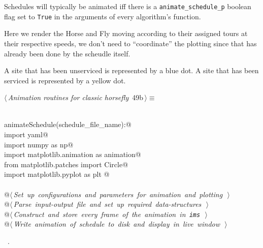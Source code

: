 \documentclass[11.5pt]{report}
\begin{document}
Schedules will typically be animated iff there is a \verb|animate_schedule_p| boolean 
flag set to \verb|True| in the arguments of every algorithm's function. 

Here we render the Horse and Fly moving according to their 
assigned tours at their respective speeds, we don't 
need to ``coordinate'' the plotting since that has already 
been done by the scheudle itself. 
    
A site that has been unserviced is represented by a blue dot. 
A site that has been serviced is represented by a yellow dot. 
   

\begin{flushleft} \small
\begin{minipage}{\linewidth}\label{scrap71}\raggedright\small
{} $\langle\,${\itshape Animation routines for classic horsefly}\nobreak\ {\footnotesize {49b}}$\,\rangle\equiv$
\vspace{-1ex}
\begin{list}{}{} \item
\mbox{}\verb@@\\
\mbox{}\verb@def animateSchedule(schedule_file_name):@\\
\mbox{}\verb@     import yaml@\\
\mbox{}\verb@     import numpy as np@\\
\mbox{}\verb@     import matplotlib.animation as animation@\\
\mbox{}\verb@     from matplotlib.patches import Circle@\\
\mbox{}\verb@     import matplotlib.pyplot as plt @\\
\mbox{}\verb@@\\
\mbox{}\verb@     @\hbox{$\langle\,${\itshape Set up configurations and parameters for animation and plotting}\nobreak\ {\footnotesize {}}$\,\rangle$}\verb@@\\
\mbox{}\verb@     @\hbox{$\langle\,${\itshape Parse input-output file and set up required data-structures}\nobreak\ {\footnotesize {}}$\,\rangle$}\verb@@\\
\mbox{}\verb@     @\hbox{$\langle\,${\itshape Construct and store every frame of the animation in \verb|ims|}\nobreak\ {\footnotesize {}}$\,\rangle$}\verb@@\\
\mbox{}\verb@     @\hbox{$\langle\,${\itshape Write animation of schedule to disk and display in live window}\nobreak\ {\footnotesize {}}$\,\rangle$}\verb@@\\
\mbox{}\verb@@{\NWsep}
\end{list}
\vspace{-1.5ex}
\footnotesize
\begin{list}{}{\setlength{\itemsep}{-\parsep}\setlength{\itemindent}{-\leftmargin}}
\item \NWtxtMacroRefIn\ .

\item{}
\end{list}
\end{minipage}\vspace{4ex}
\end{flushleft}
\end{document}
